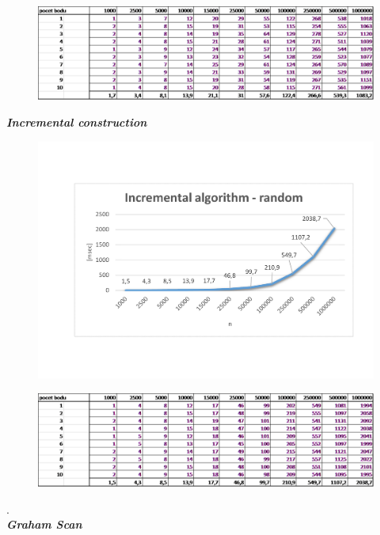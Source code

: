 \documentclass{article}
\begin{document}
\begin{figure}[htbp]
\centering
        \includegraphics[clip, trim=0cm 0cm 0cm 0cm, width=1\textwidth]{qr.png}
\end{figure}
\clearpage
\newpage
\textit{\textbf {Incremental construction}}
\\
\begin{figure}[htbp]
\centering
        \includegraphics[clip, trim=0cm 0cm 0cm 0cm, width=1\textwidth]{ir.pdf}
\end{figure}
\begin{figure}[htbp]
\centering
        \includegraphics[clip, trim=0cm 0cm 0cm 0cm, width=1\textwidth]{ir.png}
\end{figure}
.\\
\clearpage
\newpage
\textit{\textbf {Graham Scan}}
\\
\end{document}
